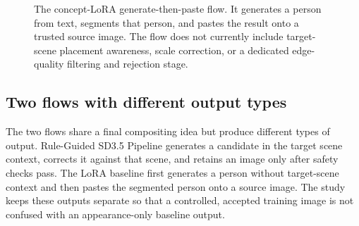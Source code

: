 \documentclass[11pt,a4paper]{article}
\begin{document}
\begin{figure}[H]
  \centering
  \caption[LoRA flow]{The concept-LoRA generate-then-paste flow. It generates a person from text, segments that person, and pastes the result onto a trusted source image. The flow does not currently include target-scene placement awareness, scale correction, or a dedicated edge-quality filtering and rejection stage.}
  \label{fig:loraarch}
\end{figure}
\subsection{Two flows with different output types}\label{sec:selection}
The two flows share a final compositing idea but produce different types of output. Rule-Guided SD3.5 Pipeline generates a candidate in the target scene context, corrects it against that scene, and retains an image only after safety checks pass. The LoRA baseline first generates a person without target-scene context and then pastes the segmented person onto a source image. The study keeps these outputs separate so that a controlled, accepted training image is not confused with an appearance-only baseline output.
\end{document}
